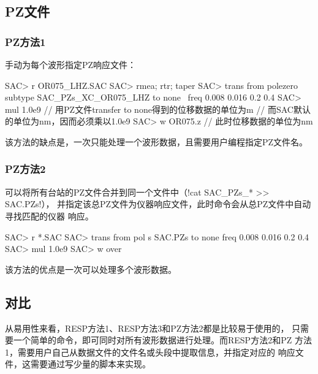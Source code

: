 \subsection{PZ文件}

\subsubsection{PZ方法1}
手动为每个波形指定PZ响应文件：
\begin{SACCode}
SAC> r OR075_LHZ.SAC
SAC> rmea; rtr; taper
SAC> trans from polezero subtype SAC_PZs_XC_OR075_LHZ to none \
                        freq 0.008 0.016 0.2 0.4
SAC> mul 1.0e9      // 用PZ文件transfer to none得到的位移数据的单位为m
                    // 而SAC默认的单位为nm，因而必须乘以1.0e9
SAC> w OR075.z      // 此时位移数据的单位为nm
\end{SACCode}
该方法的缺点是，一次只能处理一个波形数据，且需要用户编程指定PZ文件名。

\subsubsection{PZ方法2}
可以将所有台站的PZ文件合并到同一个文件中（!cat SAC_PZs_* >> SAC.PZs!），
并指定该总PZ文件为仪器响应文件，此时命令会从总PZ文件中自动寻找匹配的仪器
响应。
\begin{SACCode}
SAC> r *.SAC
SAC> trans from pol s SAC.PZs to none freq 0.008 0.016 0.2 0.4
SAC> mul 1.0e9
SAC> w over
\end{SACCode}
该方法的优点是一次可以处理多个波形数据。

\subsection{对比}
从易用性来看，RESP方法1、RESP方法3和PZ方法2都是比较易于使用的，
只需要一个简单的命令，即可同时对所有波形数据进行处理。而RESP方法2和PZ
方法1，需要用户自己从数据文件的文件名或头段中提取信息，并指定对应的
响应文件，这需要通过写少量的脚本来实现。

